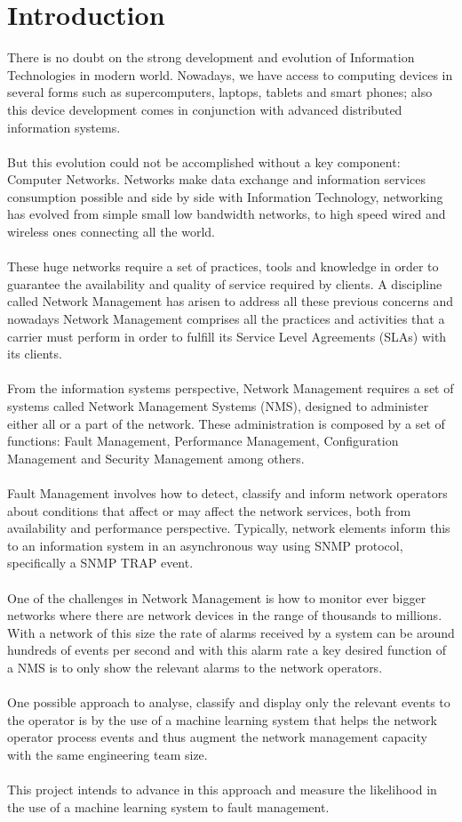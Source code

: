 \documentclass[10pt,a4paper]{article}
\begin{document}
 \section{Introduction}
 There is no doubt on the strong development and evolution of Information Technologies in modern world. Nowadays, we have access to computing devices in several forms such as supercomputers, laptops, tablets and smart phones; also this device development comes in conjunction with  advanced distributed information systems.
 \\\\
 But this evolution could not be accomplished without a key component: Computer Networks. Networks make data exchange and information services consumption possible and side by side with Information Technology, networking has evolved from simple small low bandwidth networks, to high speed wired and wireless ones connecting all the world.
 \\\\
 These huge networks require a set of practices, tools and knowledge in order to guarantee the availability and quality of service required by clients. A discipline called Network Management has arisen to address all these previous concerns and nowadays Network Management comprises all the practices and activities that a carrier must perform in order to fulfill its Service Level Agreements (SLAs) with its clients.
 \\\\
 From the information systems perspective, Network Management requires a set of systems called Network Management Systems (NMS), designed to administer either all or a part of the network. These administration is composed by a set of functions: Fault Management, Performance Management, Configuration Management and Security Management among others.
 \\\\
 Fault Management involves how to detect, classify and inform network operators about conditions that affect or may affect the network services, both from availability and performance perspective. Typically, network elements inform this to an  information system in an asynchronous way using SNMP protocol, specifically a SNMP TRAP event.
 \\\\
 One of the challenges in Network Management is how to monitor ever bigger networks where there are network devices in the range of thousands to millions. With a network of this size the rate of alarms received by a system can be around hundreds of events per second and with this alarm rate a key desired function of a NMS is to only show the relevant alarms to the network operators.
 \\\\
 One possible approach to analyse, classify and display only the relevant events to the operator is by the use of a machine learning system that helps the network operator process events and thus augment the network management capacity with the same engineering team size.
 \\\\
 This project intends to advance in this approach and measure the likelihood in the use of a machine learning system to fault management.
\end{document}
